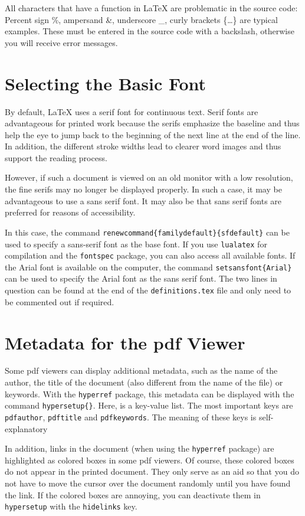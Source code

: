 All characters that have a function in \LaTeX{} are problematic in the source 
code: Percent sign \%, ampersand \&, underscore \_, curly brackets \{\ldots\} 
are typical examples. These must be entered in the source code with a backslash, 
otherwise you will receive error messages.

\section{Selecting the Basic Font}
By default, \LaTeX{} uses a serif font for continuous text. Serif fonts are 
advantageous for printed work because the serifs emphasize the baseline and thus 
help the eye to jump back to the beginning of the next line at the end of the 
line. In addition, the different stroke widths lead to clearer word images and 
thus support the reading process.

However, if such a document is viewed on an old monitor with a low resolution, 
the fine serifs may no longer be displayed properly. In such a case, it may be 
advantageous to use a sans serif font. It may also be that sans serif fonts are 
preferred for reasons of accessibility.

In this case, the command 
\texttt{\tb renewcommand\{\tb familydefault\}\{\tb sfdefault\}} can be
used to specify a sans-serif font as the base font. If you use 
\texttt{lualatex} for compilation and the \texttt{fontspec} package, you can 
also access all available fonts. If the  Arial font is available on the 
computer, the command 
\texttt{\tb setsansfont\{Arial\}} can be used to specify the Arial font as the 
sans serif font. The two lines in question can be found at the end of the 
\texttt{definitions.tex} file and only need to be commented out if required.

\section{Metadata for the pdf Viewer}
Some pdf viewers can display additional metadata, such as the name of the 
author, the title of the document (also different from the name of the file) or 
keywords. With the \texttt{hyperref} package, this metadata can be displayed 
with the command \texttt{\tb hypersetup\{\}}. Here, 
 is a key-value list. The most important keys are  
\texttt{pdfauthor}, \texttt{pdftitle} and \texttt{pdfkeywords}. The meaning of 
these keys is self-explanatory

In addition, links in the document (when using the \texttt{hyperref} package)
are highlighted as  colored boxes in some pdf viewers. Of course, these colored 
boxes do not appear in the printed document. They only serve as an aid so that 
you do not have to move the cursor over the document randomly until you have 
found the link. If the colored boxes are annoying, you can deactivate them in 
\texttt{\tb hypersetup} with the \texttt{hidelinks} key.

